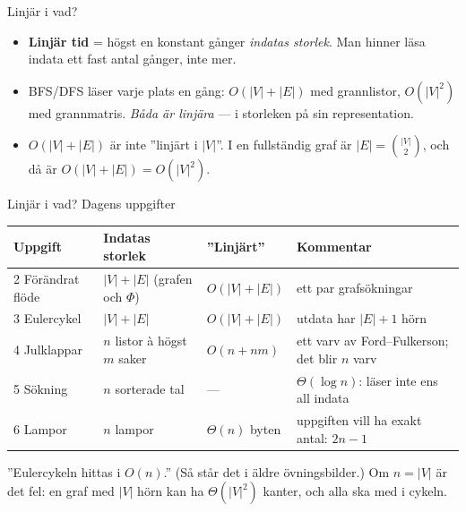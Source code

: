 \begin{frame}{Linjär i vad?}
\begin{itemize}
  \item \textbf{Linjär tid} = högst en konstant gånger \emph{indatas storlek}. Man hinner läsa
        indata ett fast antal gånger, inte mer.
  \item BFS/DFS läser varje plats en gång: $O(|V|+|E|)$ med grannlistor, $O(|V|^2)$ med
        grannmatris. \emph{Båda är linjära} — i storleken på sin representation.
  \item $O(|V|+|E|)$ är inte ”linjärt i $|V|$”. I en fullständig graf är
        $|E|=\binom{|V|}{2}$, och då är $O(|V|+|E|)=O(|V|^2)$.
\end{itemize}
\end{frame}

\begin{frame}{Linjär i vad? Dagens uppgifter}
\footnotesize
\renewcommand{\arraystretch}{1.2}
\begin{tabularx}{\textwidth}{@{}p{}p{}p{}X@{}}
\toprule
\textbf{Uppgift} & \textbf{Indatas storlek} & \textbf{”Linjärt”} & \textbf{Kommentar}\\
\midrule
2 Förändrat flöde & $|V|+|E|$ (grafen och $\Phi$) & $O(|V|+|E|)$ & ett par grafsökningar\\
3 Eulercykel & $|V|+|E|$ & $O(|V|+|E|)$ & utdata har $|E|+1$ hörn\\
4 Julklappar & $n$ listor à högst $m$ saker & $O(n+nm)$ & ett varv av Ford--Fulkerson; det blir $n$ varv\\
5 Sökning & $n$ sorterade tal & — & $\Theta(\log n)$: läser inte ens all indata\\
6 Lampor & $n$ lampor & $\Theta(n)$ byten & uppgiften vill ha exakt antal: $2n-1$\\
\bottomrule
\end{tabularx}
\medskip
\begin{missbox}
”Eulercykeln hittas i $O(n)$.” (Så står det i äldre övningsbilder.) Om $n=|V|$ är det fel: en graf
med $|V|$ hörn kan ha $\Theta(|V|^2)$ kanter, och alla ska med i cykeln.
\end{missbox}
\end{frame}

